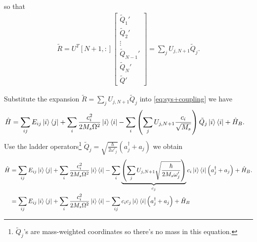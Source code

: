 \documentclass{article}
\begin{document}
so that 
\begin{align*}
	\tilde{R}=U^T[N+1,:]
	\begin{bmatrix}\tilde{Q}_1'\\
		\tilde{Q}_2'\\
		\vdots \\
		\tilde{Q}_{N-1}'\\
		\tilde{Q}_N'\\
		\tilde{Q}'
	\end{bmatrix}=\sum_{j}U_{j,N+1}\tilde{Q}_j.
\end{align*}

Substitute the expansion $\tilde{R}=\sum_{j}U_{j,N+1}\tilde{Q}_j$ into \eqref{eq:sys+coupling} we have
\begin{align*}
	\hat{H} &= 
	\sum_{ij}E_{ij}\ket{i}\bra{j}
	+ \sum_i \frac{c_{i}^2}{2M_{s} \Omega^{2}} \ket{i}\bra{i}
	- \sum_{i}\left(\sum_{j}U_{j,N+1}\frac{c_{i}}{\sqrt{M_s}}\right) \tilde{Q}_j\ket{i}\bra{i}
	+\hat{H}_{B}.
\end{align*}
Use the ladder operators\footnote{$\tilde{Q}_j$'s are mass-weighted coordinates so there's no mass in this equation.} $\tilde{Q}_j=\sqrt{\frac{\hbar}{2 \omega'_j}}\left(a^{\dagger}_j+a_j\right)$  we obtain
\begin{align}
	\hat{H} &= 
	\sum_{ij}E_{ij}\ket{i}\bra{j}
	+ \sum_i \frac{c_{i}^2}{2M_{s} \Omega^{2}} \ket{i}\bra{i}
	- \sum_{i}\underbrace{\left(\sum_{j}U_{j,N+1}\sqrt{\frac{\hbar }{2 M_s\omega'_j}}\right)}_{c_j} c_i \ket{i}\bra{i}\left(a^{\dagger}_j+a_j\right)
	+\hat{H}_{B}.\\
	&= 
	\sum_{ij}E_{ij}\ket{i}\bra{j}
	+ \sum_i \frac{c_{i}^2}{2M_{s} \Omega^{2}} \ket{i}\bra{i}
	- \sum_{ij} c_ic_j \ket{i}\bra{i}\left(a^{\dagger}_j+a_j\right)
	+\hat{H}_{B}
	\label{eq:sys+coupling_new}
\end{align}
\end{document}
